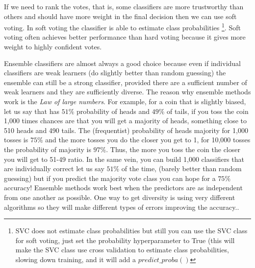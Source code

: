 \documentclass[11pt]{article}
\theoremstyle{definition}
\theoremstyle{remark}
\begin{document}
If we need to rank the votes, that is, some classifiers are more trustworthy than others and should have more weight in the final decision then we can use soft voting. In soft voting the classifier is able to estimate class probabilities \footnote{SVC does not estimate class probabilities but still you can use the SVC class for soft voting, just set the probability hyperparameter to True (this will make the SVC class use cross validation to estimate class probabilities, slowing down training, and it will add a $predict\_proba()$}. Soft voting often achieves better performance than hard voting because it gives more weight to highly confident votes.

Ensemble classifiers are almost always a good choice because even if individual classifiers are weak learners (do slightly better than random guessing) the ensemble can still be a strong classifier, provided there are a sufficient number of weak learners and they are sufficiently diverse. %
The reason why ensemble methods work is the \emph{Law of large numbers}. For example, for a coin that is slightly biased, let us say that has $51\%$ probability of heads and $49\%$ of tails, if you toss the coin 1,000 times chances are that you will get a majority of heads, something close to 510 heads and 490 tails. The (frequentist) probability of heads majority for 1,000 tosses is $75\%$ and the more tosses you do the closer you get to 1, for 10,000 tosses the probability of majority is $97\%$. Thus, the more you toss the coin the closer you will get to 51-49 ratio. In the same vein, you can build 1,000 classifiers that are individually correct let us say $51\%$ of the time, (barely better than random guessing) but if you predict the majority vote class you can hope for a $75\%$ accuracy! Ensemble methods work best when the predictors are as independent from one another as possible. One way to get diversity is using very different algorithms so they will make different types of errors improving the accuracy.\cite{geron2017hands}. 
\end{document}
